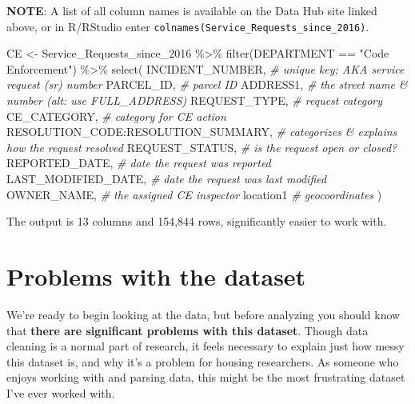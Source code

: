 \documentclass[
]{book}
\newenvironment{Shaded}{\begin{snugshade}}{\end{snugshade}}
\newcommand{\CommentTok}[1]{\textcolor[rgb]{0.56,0.35,0.01}{\textit{#1}}}
\newcommand{\FunctionTok}[1]{\textcolor[rgb]{0.00,0.00,0.00}{#1}}
\newcommand{\NormalTok}[1]{#1}
\newcommand{\OtherTok}[1]{\textcolor[rgb]{0.56,0.35,0.01}{#1}}
\newcommand{\SpecialCharTok}[1]{\textcolor[rgb]{0.00,0.00,0.00}{#1}}
\newcommand{\StringTok}[1]{\textcolor[rgb]{0.31,0.60,0.02}{#1}}
\begin{document}
\textbf{NOTE}: A list of all column names is available on the Data Hub site linked above, or in R/RStudio enter \texttt{colnames(Service\_Requests\_since\_2016)}.

\begin{Shaded}
\begin{Highlighting}[]
\NormalTok{CE }\OtherTok{\textless{}{-}}\NormalTok{ Service\_Requests\_since\_2016 }\SpecialCharTok{\%\textgreater{}\%}
  \FunctionTok{filter}\NormalTok{(DEPARTMENT }\SpecialCharTok{==} \StringTok{"Code Enforcement"}\NormalTok{) }\SpecialCharTok{\%\textgreater{}\%}
  \FunctionTok{select}\NormalTok{(}
\NormalTok{    INCIDENT\_NUMBER, }\CommentTok{\#\textquotesingle{} unique key; AKA service request (sr) number}
\NormalTok{    PARCEL\_ID, }\CommentTok{\#\textquotesingle{} parcel ID}
\NormalTok{    ADDRESS1, }\CommentTok{\#\textquotesingle{} the street name \& number (alt: use FULL\_ADDRESS)}
\NormalTok{    REQUEST\_TYPE, }\CommentTok{\#\textquotesingle{} request category}
\NormalTok{    CE\_CATEGORY, }\CommentTok{\#\textquotesingle{} category for CE action}
\NormalTok{    RESOLUTION\_CODE}\SpecialCharTok{:}\NormalTok{RESOLUTION\_SUMMARY, }\CommentTok{\#\textquotesingle{} categorizes \& explains how the request resolved}
\NormalTok{    REQUEST\_STATUS, }\CommentTok{\#\textquotesingle{} is the request open or closed?}
\NormalTok{    REPORTED\_DATE, }\CommentTok{\#\textquotesingle{} date the request was reported}
\NormalTok{    LAST\_MODIFIED\_DATE, }\CommentTok{\#\textquotesingle{} date the request was last modified}
\NormalTok{    OWNER\_NAME, }\CommentTok{\#\textquotesingle{} the assigned CE inspector}
\NormalTok{    location1 }\CommentTok{\#\textquotesingle{} geocoordinates}
\NormalTok{  )}
\end{Highlighting}
\end{Shaded}

The output is 13 columns and 154,844 rows, significantly easier to work with.

\hypertarget{problems-with-the-dataset}{%
\section{Problems with the dataset}\label{problems-with-the-dataset}}

We're ready to begin looking at the data, but before analyzing you should know that \textbf{there are significant problems with this dataset}. Though data cleaning is a normal part of research, it feels necessary to explain just how messy this dataset is, and why it's a problem for housing researchers. As someone who enjoys working with and parsing data, this might be the most frustrating dataset I've ever worked with.
\end{document}
